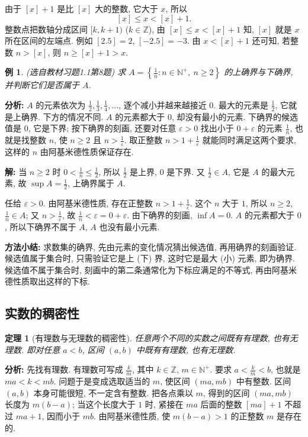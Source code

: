 \documentclass[UTF8,openany]{ctexbook}
\theoremstyle{chinesetextbook}
\newtheorem{example}{例}[section]
\newtheorem{theorem}{定理}[section]
\newenvironment{cnsolution}{\par\indent\textbf{解:} \ignorespaces}{\par}
\begin{document}
由于 $[x]+1$ 是比 $[x]$ 大的整数, 它大于 $x$, 所以
\[
[x]\le x<[x]+1.
\]
整数点把数轴分成区间 $[k,k+1)$ ($k\in\mathbb Z$), 由 $[x]\le x<[x]+1$ 知, $[x]$ 就是 $x$ 所在区间的左端点. 例如 $[2.5]=2$, $[-2.5]=-3$. 由 $x<[x]+1$ 还可知, 若整数 $n>[x]$, 则 $n\ge[x]+1>x$.
\begin{example}
\textnormal{(选自教材习题1.1第8题)} 求 $\displaystyle A=\left\{\frac1n:n\in\mathbb N^+,\ n\ge2\right\}$ 的上确界与下确界, 并判断它们是否属于 $A$.
\end{example}
\par\indent\textbf{分析:} $A$ 的元素依次为 $\displaystyle\frac12,\frac13,\frac14,\ldots$, 逐个减小并越来越接近 $0$. 最大的元素是 $\displaystyle\frac12$, 它就是上确界. 下方的情况不同. $A$ 的元素都大于 $0$, 却没有最小的元素. 下确界的候选值是 $0$, 它是下界; 按下确界的刻画, 还要对任意 $\varepsilon>0$ 找出小于 $0+\varepsilon$ 的元素 $\displaystyle\frac1n$, 也就是找整数 $n$, 使 $n\ge2$ 且 $\displaystyle n>\frac1\varepsilon$. 取正整数 $\displaystyle n>1+\frac1\varepsilon$ 就能同时满足这两个要求, 这样的 $n$ 由阿基米德性质保证存在.
\begin{cnsolution}
当 $n\ge2$ 时 $\displaystyle0<\frac1n\le\frac12$, 所以 $\displaystyle\frac12$ 是上界, $0$ 是下界. 又 $\displaystyle\frac12\in A$, 它是 $A$ 的最大元素, 故 $\displaystyle\sup A=\frac12$, 上确界属于 $A$.

任给 $\varepsilon>0$. 由阿基米德性质, 存在正整数 $\displaystyle n>1+\frac1\varepsilon$. 这个 $n$ 大于 $1$, 所以 $n\ge2$, $\displaystyle\frac1n\in A$; 又 $\displaystyle n>\frac1\varepsilon$, 故 $\displaystyle\frac1n<\varepsilon=0+\varepsilon$. 由下确界的刻画, $\inf A=0$. $A$ 的元素都大于 $0$, 所以下确界不属于 $A$, $A$ 也没有最小元素.
\end{cnsolution}
\par\indent\textbf{方法小结:} 求数集的确界, 先由元素的变化情况猜出候选值, 再用确界的刻画验证. 候选值属于集合时, 只需验证它是上 (下) 界, 这时它是最大 (小) 元素, 即为确界. 候选值不属于集合时, 刻画中的第二条通常化为下标应满足的不等式, 再由阿基米德性质取出这样的下标.
\subsection{实数的稠密性}
\begin{theorem}[有理数与无理数的稠密性]
任意两个不同的实数之间既有有理数, 也有无理数. 即对任意 $a<b$, 区间 $(a,b)$ 中既有有理数, 也有无理数.
\end{theorem}
\par\indent\textbf{分析:} 先找有理数. 有理数可写成 $\displaystyle\frac km$, 其中 $k\in\mathbb Z$, $m\in\mathbb N^+$. 要求 $\displaystyle a<\frac km<b$, 也就是 $ma<k<mb$. 问题于是变成选取适当的 $m$, 使区间 $(ma,mb)$ 中有整数. 区间 $(a,b)$ 本身可能很短, 不一定含有整数. 把各点乘以 $m$, 得到的区间 $(ma,mb)$ 长度为 $m(b-a)$; 当这个长度大于 $1$ 时, 紧接在 $ma$ 后面的整数 $[ma]+1$ 不超过 $ma+1$, 因而小于 $mb$. 由阿基米德性质, 使 $m(b-a)>1$ 的正整数 $m$ 是存在的.
\end{document}
